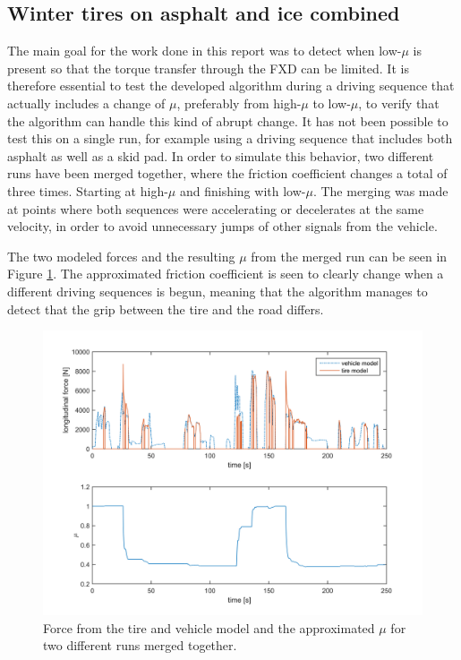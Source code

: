 \subsection{Winter tires on asphalt and ice combined}
The main goal for the work done in this report was to detect when low-$ \mu $ is present so that the torque transfer through the FXD can be limited. It is therefore essential to test the developed algorithm during a driving sequence that actually includes a change of $ \mu $, preferably from high-$ \mu $ to low-$ \mu $, to verify that the algorithm can handle this kind of abrupt change. It has not been possible to test this on a single run, for example using a driving sequence that includes both asphalt as well as a skid pad. In order to simulate this behavior, two different runs have been merged together, where the friction coefficient changes a total of three times. Starting at high-$ \mu $ and finishing with low-$ \mu $. The merging was made at points where both sequences were accelerating or decelerates at the same velocity, in order to avoid unnecessary jumps of other signals from the vehicle. 

The two modeled forces and the resulting $ \mu $ from the merged run can be seen in Figure \ref{force_mue_comb2}. The approximated friction coefficient is seen to clearly change when a different driving sequences is begun, meaning that the algorithm manages to detect that the grip between the tire and the road differs.
 
\begin{figure}[h]
	\centering
	\includegraphics[width=1.0\textwidth]{Pictures/force_mue_comb2}
	\caption {Force from the tire and vehicle model and the approximated $ \mu $ for two different runs merged together.}
	\label{force_mue_comb2}
\end{figure}

